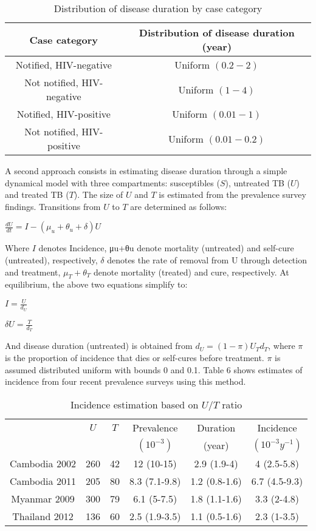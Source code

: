 \begin{table} 
    \begin{tabular}{ c c }
        \hline
        Case category & Distribution of disease duration (year) \\ 
        \hline
        Notified, HIV-negative & Uniform $(0.2 - 2)$ \\ 
        Not notified, HIV-negative & Uniform $(1 - 4)$ \\ 
        Notified, HIV-positive & Uniform $(0.01 - 1)$ \\ 
        Not notified, HIV-positive & Uniform $(0.01 - 0.2)$ \\ 
        \hline
    \end{tabular} 
    \caption{Distribution of disease duration by case category} 
\end{table}



A second approach consists in estimating disease duration through a simple dynamical model with three compartments: susceptibles ($S$), untreated TB ($U$) and treated TB ($T$). The size of $U$ and $T$ is estimated from the prevalence survey findings. Transitions from $U$ to $T$ are determined as follows:

$\frac{dU}{dt} = I - (\mu_u + \theta_u + \delta)U$

Where $I$ denotes Incidence, μu+θu denote mortality (untreated) and self-cure (untreated), respectively, $\delta$ denotes the rate of removal from U through detection and treatment, $\mu_T + \theta_T$ denote mortality (treated) and cure, respectively. At equilibrium, the above two equations simplify to: 

$I = \frac{U}{d_U}$

$\delta U = \frac{T}{d_T}$

And disease duration (untreated) is obtained from $d_U=(1-\pi)U_T d_T$, where $\pi$ is the proportion of incidence that dies or self-cures before treatment. $\pi$ is assumed distributed uniform with bounds 0 and 0.1. Table 6 shows estimates of incidence from four recent prevalence surveys using this method. 

\begin{table} 
    \begin{tabular}{ c c c c c c }
    \hline
         & $U$ & $T$ & Prevalence & Duration & Incidence \\ 
         &     &     & $(10^{-3})$ & (year)    & $(10^{-3}y^{-1})$ \\
     \hline
        Cambodia 2002 & 260 & 42 & 12 (10-15) & 2.9 (1.9-4) & 4 (2.5-5.8) \\ 
        Cambodia 2011 & 205 & 80 & 8.3 (7.1-9.8) & 1.2 (0.8-1.6) & 6.7 (4.5-9.3) \\ 
        Myanmar 2009 & 300 & 79 & 6.1 (5-7.5) & 1.8 (1.1-1.6) & 3.3 (2-4.8) \\ 
        Thailand 2012 & 136 & 60 & 2.5 (1.9-3.5) & 1.1 (0.5-1.6) & 2.3 (1-3.5) \\ 
    \hline
    \end{tabular} 
    \caption{Incidence estimation based on $U/T$ ratio
} 
\end{table}


